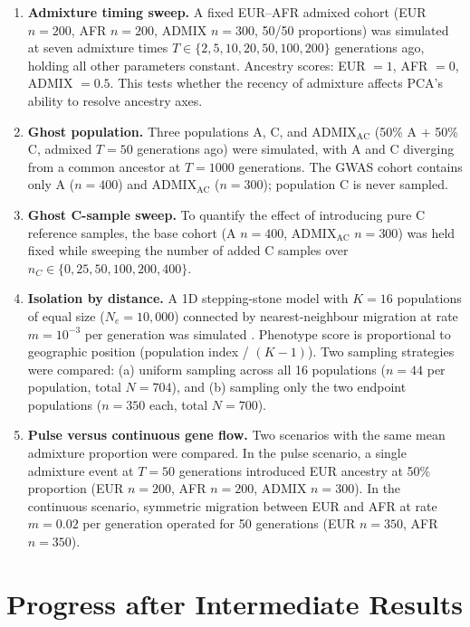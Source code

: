 \documentclass[unnumsec,webpdf,contemporary,large]{oup-authoring-template}
\theoremstyle{thmstyleone}
\theoremstyle{thmstyletwo}
\theoremstyle{thmstylethree}
\begin{document}
\begin{enumerate}
\item \textbf{Admixture timing sweep.} A fixed EUR--AFR admixed cohort (EUR $n=200$, AFR $n=200$, ADMIX $n=300$, 50/50 proportions) was simulated at seven admixture times $T \in \{2, 5, 10, 20, 50, 100, 200\}$ generations ago, holding all other parameters constant. Ancestry scores: EUR $= 1$, AFR $= 0$, ADMIX $= 0.5$. This tests whether the recency of admixture affects PCA's ability to resolve ancestry axes.

\item \textbf{Ghost population.} Three populations A, C, and ADMIX$_{\text{AC}}$ (50\% A $+$ 50\% C, admixed $T=50$ generations ago) were simulated, with A and C diverging from a common ancestor at $T=1000$ generations. The GWAS cohort contains only A ($n=400$) and ADMIX$_{\text{AC}}$ ($n=300$); population C is never sampled.

\item \textbf{Ghost C-sample sweep.} To quantify the effect of introducing pure C reference samples, the base cohort (A $n=400$, ADMIX$_{\text{AC}}$ $n=300$) was held fixed while sweeping the number of added C samples over $n_C \in \{0, 25, 50, 100, 200, 400\}$.

\item \textbf{Isolation by distance.} A 1D stepping-stone model with $K=16$ populations of equal size ($N_e = 10{,}000$) connected by nearest-neighbour migration at rate $m = 10^{-3}$ per generation was simulated \citep{Novembre2008}. Phenotype score is proportional to geographic position (population index / $(K-1)$). Two sampling strategies were compared: (a) uniform sampling across all 16 populations ($n=44$ per population, total $N=704$), and (b) sampling only the two endpoint populations ($n=350$ each, total $N=700$).

\item \textbf{Pulse versus continuous gene flow.} Two scenarios with the same mean admixture proportion were compared. In the pulse scenario, a single admixture event at $T=50$ generations introduced EUR ancestry at 50\% proportion (EUR $n=200$, AFR $n=200$, ADMIX $n=300$). In the continuous scenario, symmetric migration between EUR and AFR at rate $m=0.02$ per generation operated for 50 generations (EUR $n=350$, AFR $n=350$).
\end{enumerate}

\section{Progress after Intermediate Results}
\end{document}
